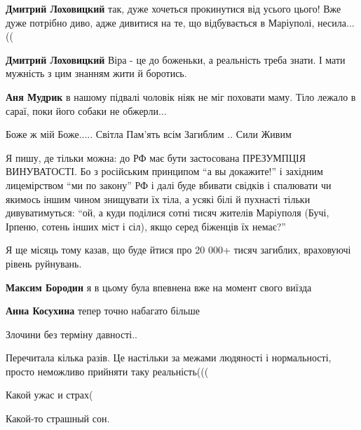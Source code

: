 \begin{itemize} %
\textbf{Дмитрий Лоховицкий} так, дуже хочеться прокинутися від усього цього! Вже дуже потрібно диво, адже дивитися на те, що відбувається в Маріуполі, несила... ((

\textbf{Дмитрий Лоховицкий} Віра - це до боженьки, а реальність треба знати. І мати мужність з цим знанням жити й боротись.

\textbf{Аня Мудрик} в нашому підвалі чоловік ніяк не міг поховати маму. Тіло лежало в сараї, поки його собаки не обжерли...
\end{itemize} %


Боже ж мій Боже..... Світла Пам'ять всім Загиблим .. Сили Живим


Я пишу, де тільки можна: до РФ має бути застосована ПРЕЗУМПЦІЯ ВИНУВАТОСТІ. Бо
з російським принципом \enquote{а вы докажите!} і західним лицемірством \enquote{ми по закону}
РФ і далі буде вбивати свідків і спалювати чи якимось іншим чином знищувати їх
тіла, а усякі білі й пухнасті тільки дивуватимуться: \enquote{ой, а куди поділися сотні
тисяч жителів Маріуполя (Бучі, Ірпеню, сотень інших міст і сіл), якщо серед
біженців їх немає?}


Я ще місяць тому казав, що буде йтися про 20 000+ тисяч загиблих, враховуючі
рівень руйнувань. 🙁

\begin{itemize} %
\textbf{Максим Бородин} я в цьому була впевнена вже на момент свого виїзда

\textbf{Анна Косухина} тепер точно набагато більше
\end{itemize} %


Злочини без терміну давності..


Перечитала кілька разів. Це настільки за межами людяності і нормальності,
просто неможливо прийняти таку реальність(((


Какой ужас и страх(


Какой-то страшный сон.

